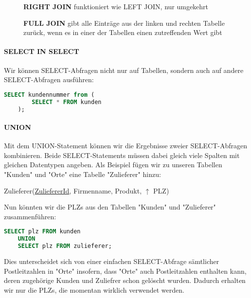 \documentclass{article}
\begin{document}
	\begin{figure}[h!]
		\centering
		
		\caption{\textbf{RIGHT JOIN} funktioniert wie LEFT JOIN, nur umgekehrt}
	\end{figure}

	\begin{figure}[h!]
		\centering
		
		\caption{\textbf{FULL JOIN} gibt alle Einträge aus der linken und rechten Tabelle zurück, wenn es in einer der Tabellen einen zutreffenden Wert gibt}
	\end{figure}

	\paragraph{SELECT IN SELECT}
	Wir können SELECT-Abfragen nicht nur auf Tabellen, sondern auch auf andere SELECT-Abfragen ausführen:

	\begin{lstlisting}[language=SQL]
	SELECT kundennummer from (
		SELECT * FROM kunden
	);
	\end{lstlisting}

	\paragraph{UNION}
	Mit dem UNION-Statement können wir die Ergebnisse zweier SELECT-Abfragen kombinieren. Beide SELECT-Statements müssen dabei gleich viele Spalten mit gleichen Datentypen angeben.
	Als Beispiel fügen wir zu unseren Tabellen "Kunden" und "Orte" eine Tabelle "Zulieferer" hinzu:

	\begin{center}
		Zulieferer(\underline{ZuliefererId}, Firmenname, Produkt, $\uparrow$ PLZ) \\
	\end{center}

	Nun könnten wir die PLZs aus den Tabellen "Kunden" und "Zulieferer" zusammenführen:

	\begin{lstlisting}[language=SQL, caption=Wir sammeln sämtliche momentan benutzten PLZs in unserer Datenbank ein]
	SELECT plz FROM kunden
	UNION
	SELECT plz FROM zulieferer;
	\end{lstlisting}

	Dies unterscheidet sich von einer einfachen SELECT-Abfrage sämtlicher Postleitzahlen in "Orte" insofern, dass "Orte" auch Postleitzahlen enthalten kann, deren zugehörige Kunden und Zuliefrer schon gelöscht wurden. Dadurch erhalten wir nur die PLZs, die momentan wirklich verwendet werden.
\end{document}
